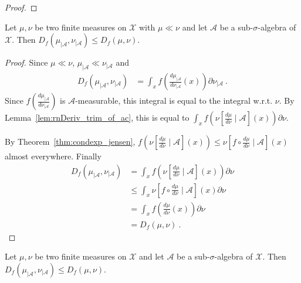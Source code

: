 \begin{proof}\leanok
\end{proof}

\begin{lemma}
  \label{lem:fDiv_trim_le_of_ac}
  \leanok
  Let $\mu, \nu$ be two finite measures on $\mathcal X$ with $\mu \ll \nu$ and let $\mathcal A$ be a sub-$\sigma$-algebra of $\mathcal X$. Then
  $D_f(\mu_{| \mathcal A}, \nu_{| \mathcal A}) \le D_f(\mu, \nu)$.
\end{lemma}

\begin{proof}\leanok
{}
Since $\mu \ll \nu$, $\mu_{| \mathcal A} \ll \nu_{| \mathcal A}$ and
\begin{align*}
D_f(\mu_{| \mathcal A}, \nu_{| \mathcal A})
&= \int_x f \left( \frac{d \mu_{| \mathcal A}}{d \nu_{| \mathcal A}}(x) \right) \partial\nu_{| \mathcal A} \: .
\end{align*}
Since $f \left( \frac{d \mu_{| \mathcal A}}{d \nu_{| \mathcal A}} \right)$ is $\mathcal A$-measurable, this integral is equal to the integral w.r.t. $\nu$.
By Lemma~\ref{lem:rnDeriv_trim_of_ac}, this is equal to $\int_x f \left( \nu\left[ \frac{d \mu}{d \nu} \mid \mathcal A\right] (x) \right) \partial\nu$.

By Theorem~\ref{thm:condexp_jensen}, $f \left( \nu\left[ \frac{d \mu}{d \nu} \mid \mathcal A\right] (x) \right) \le \nu\left[ f \circ \frac{d \mu}{d \nu} \mid \mathcal A\right] (x)$ almost everywhere.
Finally
\begin{align*}
D_f(\mu_{| \mathcal A}, \nu_{| \mathcal A})
&= \int_x f \left( \nu\left[ \frac{d \mu}{d \nu} \mid \mathcal A\right] (x) \right) \partial\nu
\\
&\le \int_x \nu\left[ f \circ \frac{d \mu}{d \nu} \mid \mathcal A\right] (x) \partial\nu
\\
&= \int_x f \left( \frac{d \mu}{d \nu} (x) \right) \partial\nu
\\
&= D_f(\mu, \nu)
\: .
\end{align*}

\end{proof}

\begin{theorem}
  \label{thm:fDiv_trim_le}
  \leanok
  Let $\mu, \nu$ be two finite measures on $\mathcal X$ and let $\mathcal A$ be a sub-$\sigma$-algebra of $\mathcal X$. Then
  $D_f(\mu_{| \mathcal A}, \nu_{| \mathcal A}) \le D_f(\mu, \nu)$.
\end{theorem}

